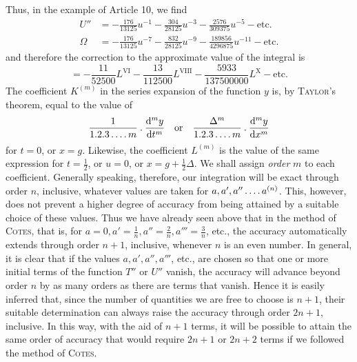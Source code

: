 Thus, in the example of Article 10, we find
\[
\begin{aligned}
U''&=-\tfrac{176}{13125}u^{-1}-\tfrac{304}{28125}u^{-3}-\tfrac{2576}{309375}u^{-5}-\text{etc.}\\
\Omega&=-\tfrac{176}{13125}u^{-7}-\tfrac{832}{28125}u^{-9}-\tfrac{189856}{4296875}u^{-11}-\text{etc.}
\end{aligned}
\]
and therefore the correction to the approximate value of the integral is
\[
=-\frac{11}{52500}L^{\mathrm{VI}}-\frac{13}{112500}L^{\mathrm{VIII}}-\frac{5933}{137500000}L^{\mathrm{X}}-\text{etc.}
\]
The coefficient $K^{(m)}$ in the series expansion of the function $y$ is, by \mbox{\textsc{Taylor}}’s theorem, equal to the value of
\[
\frac{1}{1.2.3\mathinner{.\,.\,.\,.}m}\mathbin{.}\frac{\mathrm{d}^m y}{\mathrm{d}t^m}
\quad\text{or}\quad
\frac{\Delta^m}{1.2.3\mathinner{.\,.\,.\,.}m}\mathbin{.}\frac{\mathrm{d}^m y}{\mathrm{d}x^m}
\]
for $t=0$, or $x=g$. Likewise, the coefficient $L^{(m)}$ is the value of the same expression for $t=\frac12$, or $u=0$, or $x=g+\frac12\Delta$. We shall assign \textit{order} $m$ to each coefficient. Generally speaking, therefore, our integration will be exact through order $n$, inclusive, whatever values are taken for $a,a',a''\mathinner{.\,.\,.\,.}a^{(n)}$. This, however, does not prevent a higher degree of accuracy from being attained by a suitable choice of these values. Thus we have already seen above that in the method of \textsc{Cotes}, that is, for $a=0,a'=\frac1n,a''=\frac2n,a'''=\frac3n$, etc., the accuracy automatically extends through order $n+1$, inclusive, whenever $n$ is an even number. In general, it is clear that if the values $a,a',a'',a'''$, etc., are chosen so that one or more initial terms of the function $T''$ or $U''$ vanish, the accuracy will advance beyond order $n$ by as many orders as there are terms that vanish. Hence it is easily inferred that, since the number of quantities we are free to choose is $n+1$, their suitable determination can always raise the accuracy through order $2n+1$, inclusive. In this way, with the aid of $n+1$ terms, it will be possible to attain the same order of accuracy that would require $2n+1$ or $2n+2$ terms if we followed the method of \textsc{Cotes}.

